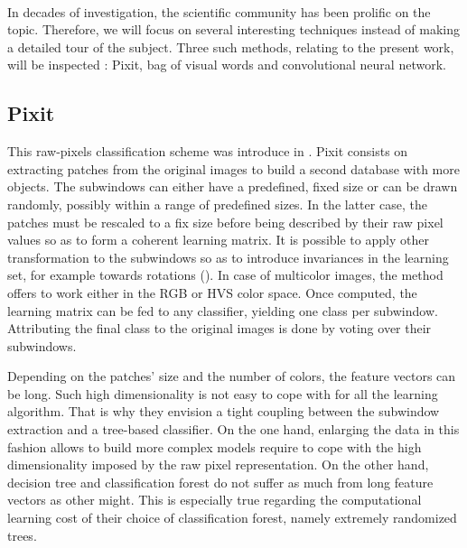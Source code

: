 \documentclass[a4paper]{report}
\newlength{\larg}
\begin{document}
\paragraph{}
In decades of investigation, the scientific community has been prolific on the topic. Therefore, we will focus on several interesting techniques instead of making a detailed tour of the subject.
Three such methods, relating to the present work, will be inspected : Pixit, bag of visual words and convolutional neural network.

\subsection{\label{subsec:Pixit}Pixit}
This raw-pixels classification scheme was introduce in \cite{pixit}. Pixit consists on extracting patches from the original images to build a second database with more objects. The subwindows can either have a predefined, fixed size or can be drawn randomly, possibly within a range of predefined sizes. In the latter case, the patches must be rescaled to a fix size before being described by their raw pixel values so as to form a coherent learning matrix. It is possible to apply other transformation to the subwindows so as to introduce invariances in the learning set, for example towards rotations (\cite{recapPixit}). In case of multicolor images, the method offers to work either in the RGB or HVS color space. 
Once computed, the learning matrix can be fed to any classifier, yielding one class per subwindow. Attributing the final class to the original images is done by voting over their subwindows.
\par
Depending on the patches' size and the number of colors, the feature vectors can be long. Such high dimensionality is not easy to cope with for all the learning algorithm. That is why they envision a tight coupling between the subwindow extraction and a tree-based classifier. On the one hand, enlarging the data in this fashion allows to build more complex models require to cope with the high dimensionality imposed by the raw pixel representation. On the other hand, decision tree and classification forest do not suffer as much from long feature vectors as other might. This is especially true regarding the computational learning cost of their choice of classification forest, namely extremely randomized trees.
\end{document}

